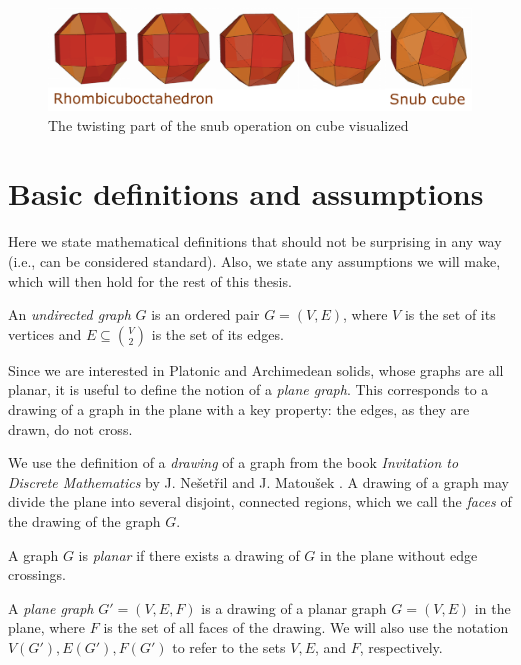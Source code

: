 \begin{description}
\begin{figure}[H]
    \centering
    \includegraphics[width=1\textwidth]{Resources/Figs/op_snub_pdfa.pdf}
    \caption{The twisting part of the snub operation on cube visualized \cite{natal-polyhed-viewer}}
    \label{fig:op_snub}
\end{figure}
    
\end{description}

\section{Basic definitions and assumptions}

Here we state mathematical definitions that should not be surprising in any way (i.e., can be considered standard). Also, we state any assumptions we will make, which will then hold for the rest of this thesis.

\begin{defn}
    An \emph{undirected graph} $G$ is an ordered pair $G = (V,E)$, where $V$ is the set of its vertices and $E \subseteq \binom{V}{2}$ is the set of its edges. 
\end{defn}

Since we are interested in Platonic and Archimedean solids, whose graphs are all planar, it is useful to define the notion of a \textit{plane graph}. This corresponds to a drawing of a graph in the plane with a key property: the edges, as they are drawn, do not cross.

We use the definition of a \textit{drawing} of a graph from the book \textit{Invitation to Discrete Mathematics} by J. Nešetřil and J. Matoušek \cite{matousek2009}. A drawing of a graph may divide the plane into several disjoint, connected regions, which we call the \textit{faces} of the drawing of the graph $G$.

\begin{defn}
    A graph $G$ is \emph{planar} if there exists a drawing of $G$ in the plane without edge crossings.
\end{defn}

\begin{defn}
    A \emph{plane graph} $G' = (V,E,F)$ is a drawing of a planar graph $G=(V,E)$ in the plane, where $F$ is the set of all faces of the drawing. We will also use the notation $V(G'), E(G'), F(G')$ to refer to the sets $V, E$, and $F$, respectively.
\end{defn}

